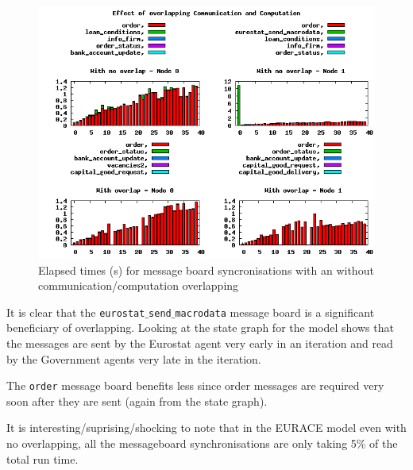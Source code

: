 \begin{figure}[ht]
 \centering
  \includegraphics[width=450pt]{overlap.png}
 \caption{Elapsed times (s) for message board syncronisations with an without communication/computation overlapping}
 \label{fig:overlap}
\end{figure}

It is clear that the \texttt{eurostat$\_$send$\_$macrodata} message board is a significant beneficiary of overlapping. Looking at the state graph for the model shows that the messages are sent by the Eurostat agent very early in an iteration and read by the Government agents very late in the iteration.

The \texttt{order} message board benefits less since order messages are required very soon after they are sent (again from the state graph).

It is interesting/suprising/shocking to note that in the EURACE model even with no overlapping, all the messageboard synchronisations are only taking 5\% of the total run time.




 
